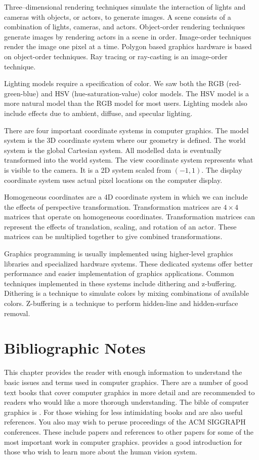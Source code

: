 Three--dimensional rendering techniques simulate the interaction of lights and cameras with objects, or actors, to generate images. A scene consists of a combination of lights, cameras, and actors. Object-order rendering techniques generate images by rendering actors in a scene in order. Image-order techniques render the image one pixel at a time. Polygon based graphics hardware is based on object-order techniques. Ray tracing or ray-casting is an image-order technique.

Lighting models require a specification of color. We saw both the RGB (red-green-blue) and HSV (hue-saturation-value) color models. The HSV model is a more natural model than the RGB model for most users. Lighting models also include effects due to ambient, diffuse, and specular lighting.

There are four important coordinate systems in computer graphics. The model system is the 3D coordinate system where our geometry is defined. The world system is the global Cartesian system. All modelled data is eventually transformed into the world system. The view coordinate system represents what is visible to the camera. It is a 2D system scaled from $(-1,1)$. The display coordinate system uses actual pixel locations on the computer display.

Homogeneous coordinates are a 4D coordinate system in which we can include the effects of perspective transformation. Transformation matrices are \(4 \times 4\) matrices that operate on homogeneous coordinates. Transformation matrices can represent the effects of translation, scaling, and rotation of an actor. These matrices can be multiplied together to give combined transformations.

Graphics programming is usually implemented using higher-level graphics libraries and specialized hardware systems. These dedicated systems offer better performance and easier implementation of graphics applications. Common techniques implemented in these systems include dithering and z-buffering. Dithering is a technique to simulate colors by mixing combinations of available colors. Z-buffering is a technique to perform hidden-line and hidden-surface removal.

\section{Bibliographic Notes}
\label{Ch03BibNotes}

This chapter provides the reader with enough information to understand the basic issues and terms used in computer graphics. There are a number of good text books that cover computer graphics in more detail and are recommended to readers who would like a more thorough understanding. The bible of computer graphics is \cite{FoleyVanDam90}. For those wishing for less intimidating books \cite{BurgerGillies89} and \cite{Watt93} are also useful references. You also may wish to peruse proceedings of the ACM SIGGRAPH conferences. These include papers and references to other papers for some of the most important work in computer graphics. \cite{Carlson85} provides a good introduction for those who wish to learn more about the human vision system.


